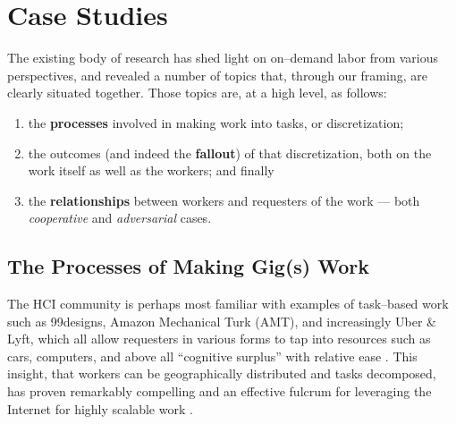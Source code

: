 \documentclass{sigchi}
\def\plainkeywords{Crowdsourcing}
\begin{document}
\keywords{\plainkeywords}


\section{Case Studies}
The existing body of research has shed light on on--demand labor from various perspectives,
and revealed a number of topics that,
through our framing, are clearly situated together.
Those topics are, at a high level, as follows:
\begin{enumerate}
\item the \textbf{processes} involved in making work into tasks, or discretization;
\item the outcomes (and indeed the \textbf{fallout}) of that discretization,
both on the work itself as well as the workers;
and finally
\item the \textbf{relationships} between workers and requesters of the work
--- both \textit{cooperative} and \textit{adversarial} cases.
\end{enumerate}


\subsection{The Processes of Making Gig(s) Work}\label{sec:MakingGigsWork}

\cite{olson2014ways}
The HCI community is perhaps most familiar with examples of task--based work such as
99designs,
Amazon Mechanical Turk (AMT),
and increasingly
Uber \& Lyft,
which all allow requesters in various forms to tap into
resources such as
cars,
computers, and above all
``cognitive surplus''
with relative ease
\cite{howe2006rise,DillahuntPromise,storiesIraniSilberman,shirky2010cognitive}.
This insight, that
workers can be geographically distributed and tasks decomposed,
has proven remarkably compelling
and an effective fulcrum for leveraging the Internet for highly scalable work
\cite{sensitiveTasks,embracingErrorKrishna}.
\end{document}
